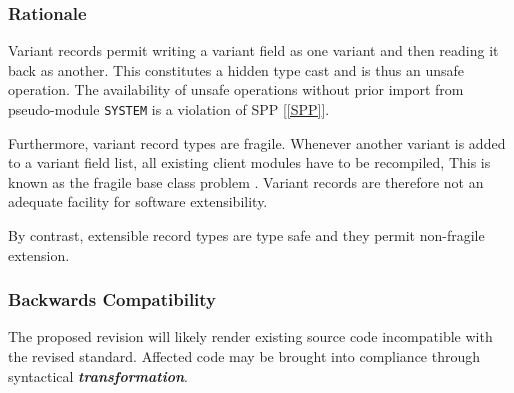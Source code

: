 \documentclass[10pt,a4paper,leqno,fleqn]{article}
\renewcommand{\emph}[1]{\textbf{\textit{#1}}}
\begin{document}
\subsubsection{Rationale}

Variant records permit writing a variant field as one variant and then reading
it back as another. This constitutes a hidden type cast and is thus an unsafe
operation. The availability of unsafe operations without prior import from
pseudo-module \verb|SYSTEM| is a violation of SPP [\ref{SPP}].

Furthermore, variant record types are fragile. Whenever another variant is
added to a variant field list, all existing client modules have to be recompiled,
This is known as the fragile base class problem \cite{Mikhajlov1998}.
Variant records are therefore not an adequate facility for software extensibility.

By contrast, extensible record types are type safe and they permit
non-fragile extension.

\subsubsection{Backwards Compatibility}

The proposed revision will likely render existing source code incompatible with
the revised standard. Affected code may be brought into compliance through
syntactical \emph{transformation}.


\printglossary[title=Definitions, toctitle=Definitions]




\end{document}
